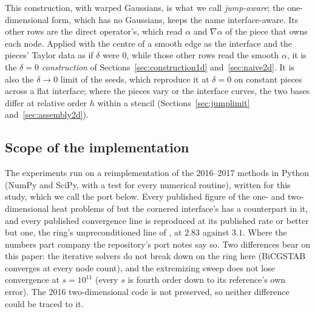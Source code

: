 \documentclass[11pt]{amsart}
\theoremstyle{definition}
\theoremstyle{remark}
\begin{document}
This construction, with warped Gaussians, is what we call
\emph{jump-aware}; the one-dimensional form, which has no Gaussians, keeps
the name interface-aware. Its other rows are the direct operator's, which
read $\alpha$ and $\nabla \alpha$ of the piece that owns each node. Applied
with the centre of a smooth edge as the interface and the pieces' Taylor
data as if $\delta$ were $0$, while those other rows read the smooth
$\alpha$, it is the \emph{$\delta = 0$ construction} of Sections~\ref{sec:construction1d}
and~\ref{sec:naive2d}. It is also the $\delta \to 0$ limit of the seeds,
which reproduce it at $\delta = 0$ on constant pieces across a flat
interface; where the pieces vary or the interface curves, the two bases
differ at relative order $h$ within a stencil (Sections~\ref{sec:jumplimit}
and~\ref{sec:assembly2d}).

\subsection{Scope of the implementation}
\label{sec:scope}
The experiments run on a reimplementation of the 2016--2017 methods in
Python (NumPy and SciPy, with a test for every numerical routine), written
for this study, which we call the port below. Every published figure of the one- and two-dimensional
heat problems of \cite{Martin2016,MartinFornberg2017heat} but the cornered
interface's has a counterpart in it, and every published convergence line
is reproduced at its published rate or better but one, the ring's
unpreconditioned line of \cite[Fig.~17]{MartinFornberg2017heat}, at $2.83$
against $3.1$. Where the numbers part
company the repository's port notes say so. Two differences
bear on this paper: the iterative solvers do not break down on the ring
here (BiCGSTAB converges at every node count), and the extremizing sweep
does not lose convergence at $s = 10^{11}$ (every $s$ is fourth order down
to its reference's own error). The 2016 two-dimensional code is not
preserved, so neither difference could be traced to it.
\end{document}
